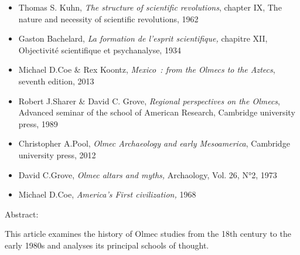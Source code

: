 \documentclass[11pt,a4paper]{article}
\begin{document}
\begin{itemize}[leftmargin=1.3em,itemsep=.18em,topsep=.25em]
\item
  Thomas S. Kuhn, \emph{The structure of scientific revolutions}, chapter IX, The nature and necessity of scientific revolutions, 1962
\item
  Gaston Bachelard, \emph{La formation de l'esprit scientifique,} chapitre XII, Objectivité scientifique et psychanalyse, 1934
\item
  Michael D.Coe \& Rex Koontz, \emph{Mexico~: from the Olmecs to the Aztecs}, seventh edition, 2013
\item
  Robert J.Sharer \& David C. Grove, \emph{Regional perspectives on the Olmecs}, Advanced seminar of the school of American Research, Cambridge university press, 1989
\item
  Christopher A.Pool, \emph{Olmec Archaeology and early Mesoamerica}, Cambridge university press, 2012
\item
  David C.Grove, \emph{Olmec altars and myths,} Archaology, Vol. 26, N°2, 1973
\item
  Michael D.Coe, \emph{America's First civilization,} 1968
\end{itemize}

Abstract:

This article examines the history of Olmec studies from the 18th century to the early 1980s and analyses its principal schools of thought.
\end{document}
